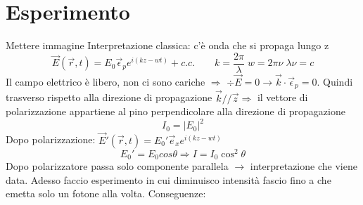 \section*{Esperimento}
Mettere immagine \newline
Interpretazione classica: c'è onda che si propaga lungo z
\begin{equation*}
    \vec{E}(\vec{r},t) = E_0 \vec{\epsilon}_p e^{i(kz-wt)}+ c.c. \qquad k = \frac{2\pi}{\lambda} \; w = 2\pi\nu \; \lambda\nu = c
\end{equation*} 
Il campo elettrico è libero, non ci sono cariche $\Rightarrow$ $\div\vec{E}=0 \rightarrow \vec{k}\cdot \vec{\epsilon}_p =0$. Quindi trasverso rispetto alla direzione di propagazione \newline
$\vec{k} // \vec{z} \Rightarrow$ il vettore di polarizzazione appartiene al pino perpendicolare alla direzione di propagazione
\begin{equation*}
    I_0 = {|E_0|}^2
\end{equation*} 
Dopo polarizzazione: $\vec{E}'(\vec{r},t) = E_0'\vec{e}_x e^{i(kz-wt)}$
\begin{equation*}
    E_0' = E_0 cos\theta \Rightarrow I = I_0 \cos^2\theta
\end{equation*}
Dopo polarizzatore passa solo componente parallela $\rightarrow$ interpretazione che viene data. \newline
Adesso faccio esperimento in cui diminuisco intensità fascio fino a che emetta solo un fotone alla volta. Conseguenze:
